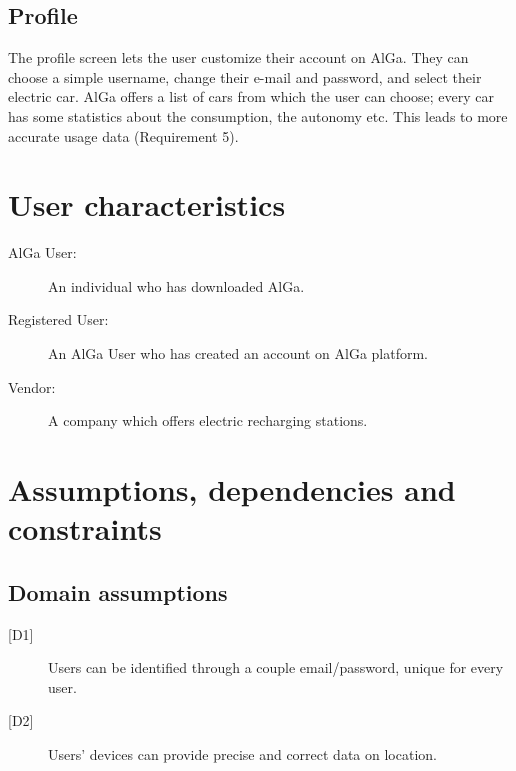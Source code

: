 \subsection*{Profile}
The profile screen lets the user customize their account on AlGa. They can choose a simple username, change their e-mail and password, and select their electric car. AlGa offers a list of cars from which the user can choose; every car has some statistics about the consumption, the autonomy etc. This leads to more accurate usage data (Requirement 5).

\section{User characteristics}
\begin{description}
\item[AlGa User:] An individual who has downloaded AlGa.
\item[Registered User:] An AlGa User who has created an account on AlGa platform.
\item[Vendor:] A company which offers electric recharging stations.
\end{description}

\section{Assumptions, dependencies and constraints}
\subsection*{Domain assumptions}
\begin{description}
    \item[{[D1]}] Users can be identified through a couple email/password, unique for every user.
    \item[{[D2]}] Users’ devices can provide precise and correct data on location.
\end{description}

